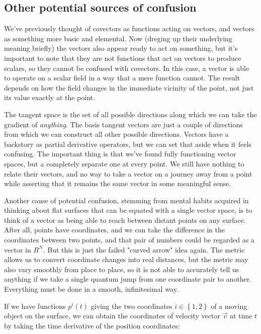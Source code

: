 \subsection{Other potential sources of confusion}

We've previously thought of covectors as functions acting on vectors, and vectors as something more basic and elemental. Now (dreging up their underlying meaning briefly) the vectors also appear ready to act on something, but it's important to note that they are not functions that act on vectors to produce scalars, so they cannot be confused with covectors. In this case, a vector is able to operate on a scalar field in a way that a mere function cannot. The result depends on how the field changes in the immediate vicinity of the point, not just its value exactly at the point.

The tangent space is the set of all possible directions along which we can take the gradient of \textit{anything}. The basis tangent vectors are just a couple of directions from which we can construct all other possible directions. Vectors have a backstory as partial derivative operators, but we can set that aside when it feels confusing. The important thing is that we've found fully functioning vector spaces, but a completely separate one at every point. We still have nothing to relate their vectors, and no way to take a vector on a journey away from a point while asserting that it remains the same vector in some meaningful sense.

Another cause of potential confusion, stemming from mental habits acquired in thinking about flat surfaces that can be equated with a single vector space, is to think of a vector as being able to reach between distant points on any surface. After all, points have coordinates, and we can take the difference in the coordinates between two points, and that pair of numbers could be regarded as a vector in $R^N$. But this is just the failed "curved arrow" idea again. The metric allows us to convert coordinate changes into real distances, but the metric may also vary smoothly from place to place, so it is not able to accurately tell us anything if we take a single quantum jump from one coordinate pair to another. Everything must be done in a smooth, infinitesimal way.

If we have functions $p^i(t)$ giving the two coordinates $i \in \left\{ 1, 2 \right\}$ of a moving object on the surface, we can obtain the coordinates of velocity vector $\vec{v}$ at time $t$ by taking the time derivative of the position coordinates:

